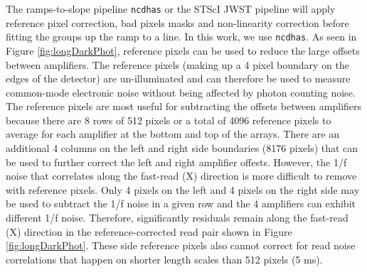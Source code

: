 \documentclass[]{aastex62}
\begin{document}
The ramps-to-slope pipeline \texttt{ncdhas} or the STScI JWST pipeline will apply reference pixel correction, bad pixels masks and non-linearity correction before fitting the groups up the ramp to a line.
In this work, we use \texttt{ncdhas}.
As seen in Figure \ref{fig:longDarkPhot}, reference pixels can be used to reduce the large offsets between amplifiers.
The reference pixels (making up a 4 pixel boundary on the edges of the detector) are un-illuminated and can therefore be used to measure common-mode electronic noise without being affected by photon counting noise.
The reference pixels are most useful for subtracting the offsets between amplifiers because there are 8 rows of 512 pixels or a total of 4096 reference pixels to average for each amplifier at the bottom and top of the arrays.
There are an additional 4 columns on the left and right side boundaries (8176 pixels) that can be used to further correct the left and right amplifier offests.
However, the 1/f noise that correlates along the fast-read (X) direction is more difficult to remove with reference pixels.
Only 4 pixels on the left and 4 pixels on the right side may be used to subtract the 1/f noise in a given row and the 4 amplifiers can exhibit different 1/f noise. 
Therefore, significantly residuals remain along the fast-read (X) direction in the reference-corrected read pair shown in Figure \ref{fig:longDarkPhot}.
These side reference pixels also cannot correct for read noise correlations that happen on shorter length scales than 512 pixels (5 ms).
\end{document}
